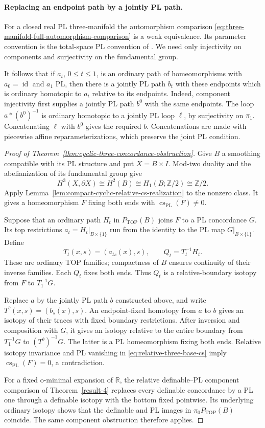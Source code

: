 \paragraph{Replacing an endpoint path by a jointly PL path.}
For a closed real PL three-manifold the automorphism comparison
\eqref{eq:three-manifold-full-automorphism-comparison} is a weak
equivalence.  Its parameter convention is the total-space PL
convention of
\cite[Section~2.1, p.~222; Theorem~3.1.2, pp.~225--226]{Hamstrom1974}.
We need only injectivity on components and surjectivity on
the fundamental group.

It follows that if $a_t$, $0\leq t\leq1$, is an ordinary path
of homeomorphisms with $a_0=\operatorname{id}$ and $a_1$ PL,
then there is a jointly PL path $b_t$ with these endpoints
which is ordinary homotopic to $a_t$ relative to its endpoints.
Indeed, component injectivity first supplies a jointly PL path
$b^0$ with the same endpoints.  The loop $a*(b^0)^{-1}$ is
ordinary homotopic to a jointly PL loop $\ell$, by surjectivity
on $\pi_1$.  Concatenating $\ell$ with $b^0$ gives the required
$b$.  Concatenations are made with piecewise affine
reparameterizations, which preserve the joint PL condition.

\begin{proof}[Proof of Theorem~\ref{thm:cyclic-three-concordance-obstruction}]
Give $B$ a smoothing compatible with its PL structure and put
$X=B\times I$.  Mod-two duality and the abelianization of its
fundamental group give
\[
 H^3(X,\partial X)\cong H^2(B)
 \cong H_1(B;\mathbb Z/2)\cong\mathbb Z/2.
\]
Apply Lemma~\ref{lem:compact-cyclic-relative-cs-realization} to
the nonzero class.  It gives a homeomorphism $F$ fixing both
ends with $\operatorname{cs}_{\mathrm{PL}}(F)\ne0$.

Suppose that an ordinary path $H_t$ in $P_{\mathrm{TOP}}(B)$
joins $F$ to a PL concordance $G$.  Its top restrictions
$a_t=H_t|_{B\times\{1\}}$ run from the identity to the PL
map $G|_{B\times\{1\}}$.  Define
\[
 T_t(x,s)=(a_{ts}(x),s),\qquad Q_t=T_t^{-1}H_t.
\]
These are ordinary TOP families; compactness of $B$ ensures
continuity of their inverse families.  Each $Q_t$ fixes both
ends.  Thus $Q_t$ is a relative-boundary isotopy from $F$ to
$T_1^{-1}G$.

Replace $a$ by the jointly PL path $b$ constructed above, and
write $T^b(x,s)=(b_s(x),s)$.  An endpoint-fixed homotopy from
$a$ to $b$ gives an isotopy of their traces with fixed boundary
restrictions.  After inversion and composition with $G$, it
gives an isotopy relative to the entire boundary from
$T_1^{-1}G$ to $(T^b)^{-1}G$.  The latter is a PL
homeomorphism fixing both ends.  Relative isotopy invariance
and PL vanishing in \eqref{eq:relative-three-base-cs} imply
$\operatorname{cs}_{\mathrm{PL}}(F)=0$, a contradiction.

For a fixed o-minimal expansion of $\mathbb R$, the relative
definable--PL component comparison of Theorem~\ref{result-4}
replaces every definable concordance by a PL one through a
definable isotopy with the bottom fixed pointwise.  Its
underlying ordinary isotopy shows that the definable and PL
images in $\pi_0P_{\mathrm{TOP}}(B)$ coincide.  The same
component obstruction therefore applies.
\end{proof}


